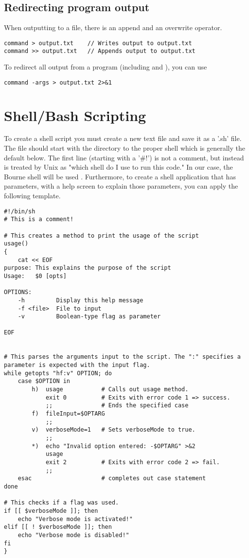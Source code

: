 \subsection{Redirecting program output}

When outputting to a file, there is an append and an overwrite operator.
\begin{lstlisting}
command > output.txt    // Writes output to output.txt
command >> output.txt   // Appends output to output.txt
\end{lstlisting}
To redirect all output from a program (including  and ), you can use 
\begin{lstlisting}
command -args > output.txt 2>&1
\end{lstlisting}






\section{Shell/Bash Scripting}

\lstset{language=Bash, style=shellstyle}

To create a shell script you must create a new text file and save it as a '.sh' file. The file should start with the directory to the proper shell which is generally the default below. The first line (starting with a  '\#!') is not a comment, but instead is treated by Unix as "which shell do I use to run this code." In our case, the Bourne shell will be used \cite{linux: shell scripting}. Furthermore, to create a shell application that has parameters, with a help screen to explain those parameters, you can apply the following template.
\begin{lstlisting}
#!/bin/sh
# This is a comment!

# This creates a method to print the usage of the script
usage()
{
	cat << EOF
purpose: This explains the purpose of the script
Usage:   $0 [opts]

OPTIONS:
	-h         Display this help message
	-f <file>  File to input
	-v         Boolean-type flag as parameter
	
EOF


# This parses the arguments input to the script. The ":" specifies a parameter is expected with the input flag.
while getopts "hf:v" OPTION; do
	case $OPTION in
		h)	usage			# Calls out usage method.
			exit 0			# Exits with error code 1 => success.
			;;				# Ends the specified case
		f)	fileInput=$OPTARG
			;;
		v)	verboseMode=1	# Sets verboseMode to true.
			;;
		*)	echo "Invalid option entered: -$OPTARG" >&2
			usage
			exit 2			# Exits with error code 2 => fail.
			;;
	esac					# completes out case statement
done

# This checks if a flag was used.
if [[ $verboseMode ]]; then
	echo "Verbose mode is activated!"
elif [[ ! $verboseMode ]]; then
	echo "Verbose mode is disabled!"
fi
}
\end{lstlisting}

